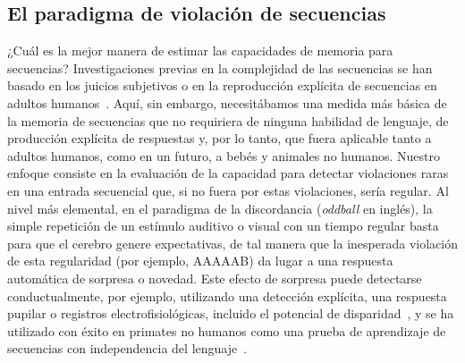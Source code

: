 \subsection{El paradigma de violación de secuencias}


¿Cuál es la mejor manera de estimar las capacidades de memoria para secuencias? Investigaciones previas en la complejidad de las secuencias se han basado en los juicios subjetivos o en la reproducción explícita de secuencias en adultos humanos~\cite{f61}. Aquí, sin embargo, necesitábamos una medida más básica de la memoria de secuencias que no requiriera de ninguna habilidad de lenguaje, de producción explícita de respuestas y, por lo tanto, que fuera aplicable tanto a adultos humanos, como en un futuro, a bebés y animales no humanos. Nuestro enfoque consiste en la evaluación de la capacidad para detectar violaciones raras en una entrada secuencial que, si no fuera por estas violaciones, sería regular. Al nivel más elemental, en el paradigma de la discordancia ({\em oddball} en inglés), la simple repetición de un estímulo auditivo o visual con un tiempo regular basta para que el cerebro genere expectativas, de tal manera que la inesperada violación de esta regularidad (por ejemplo, AAAAAB) da lugar a una respuesta automática de sorpresa o novedad. Este efecto de sorpresa puede detectarse conductualmente, por ejemplo, utilizando una detección explícita, una respuesta pupilar o registros electrofisiológicas, incluido el potencial de disparidad~\cite{f62,f63,f64}, y se ha utilizado con éxito en primates no humanos como una prueba de aprendizaje de secuencias con independencia del lenguaje~\cite{f5,f65,f66}.

